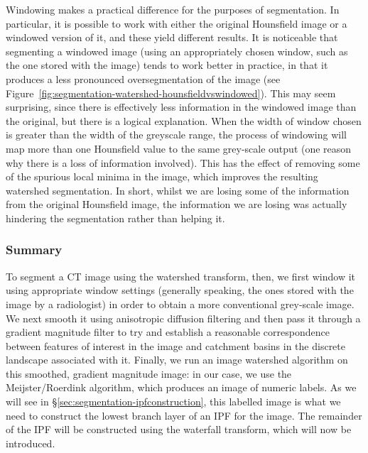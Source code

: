 Windowing makes a practical difference for the purposes of segmentation. In particular, it is possible to work with either the original Hounsfield image or a windowed version of it, and these yield different results. It is noticeable that segmenting a windowed image (using an appropriately chosen window, such as the one stored with the image) tends to work better in practice, in that it produces a less pronounced oversegmentation of the image (see Figure~\ref{fig:segmentation-watershed-hounsfieldvswindowed}). This may seem surprising, since there is effectively less information in the windowed image than the original, but there is a logical explanation. When the width of window chosen is greater than the width of the greyscale range, the process of windowing will map more than one Hounsfield value to the same grey-scale output (one reason why there is a loss of information involved). This has the effect of removing some of the spurious local minima in the image, which improves the resulting watershed segmentation. In short, whilst we are losing some of the information from the original Hounsfield image, the information we are losing was actually hindering the segmentation rather than helping it.


\subsubsection{Summary}

To segment a CT image using the watershed transform, then, we first window it using appropriate window settings (generally speaking, the ones stored with the image by a radiologist) in order to obtain a more conventional grey-scale image. We next smooth it using anisotropic diffusion filtering and then pass it through a gradient magnitude filter to try and establish a reasonable correspondence between features of interest in the image and catchment basins in the discrete landscape associated with it. Finally, we run an image watershed algorithm on this smoothed, gradient magnitude image: in our case, we use the Meijster/Roerdink algorithm, which produces an image of numeric labels. As we will see in \S\ref{sec:segmentation-ipfconstruction}, this labelled image is what we need to construct the lowest branch layer of an IPF for the image. The remainder of the IPF will be constructed using the waterfall transform, which will now be introduced.

